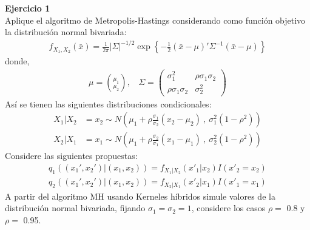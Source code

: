 \documentclass[a4paper, 11pt]{article}
\newenvironment{problem}[2][Ejercicio]
{ \begin{mdframed}[backgroundcolor= red!50] \textbf{#1 #2} \\}
	{  \end{mdframed}}
\begin{document}
	\setlength{\parskip}{\medskipamount}
	\setlength{\parindent}{0pt}

\begin{problem}{1} 
    Aplique el algoritmo de Metropolis-Hastings considerando como función objetivo la distribución normal bivariada:
    \begin{align*}
      f_{X_1,X_2}(\bar{x}) = \frac{1}{2\pi} |\Sigma|^{-1/2} \exp \left \{ -\frac{1}{2} (\bar{x} - \mu)' \Sigma^{-1}(\bar{x} - \mu) \right \}
    \end{align*}
    donde,
    \begin{align*}
      \mu = \binom{\mu_1}{\mu_2}, \:\:\:\: \Sigma = 
      \begin{pmatrix}
        \sigma_1^2 &  \rho \sigma_1 \sigma_2\\
        \rho \sigma_1 \sigma_2 & \sigma_2^2
      \end{pmatrix}
    \end{align*}
    Así se tienen las siguientes distribuciones condicionales: 
    \begin{align*}
      X_1|X_2 &= x_2 \sim N \left(\mu_1 + \rho \frac{\sigma_1 }{\sigma_2}(x_2 - \mu_2 )\:,\: \sigma_1^2 (1-\rho^2)\right)\\
      X_2|X_1 &= x_1 \sim N \left(\mu_1 + \rho \frac{\sigma_2 }{\sigma_1}(x_1 - \mu_1 )\:,\: \sigma_2^2 (1-\rho^2)\right)
    \end{align*}
    Considere las siguientes propuestas: 
    \begin{align*}
      q_1((x_1',x_2')|(x_1,x_2)) = f_{X_1|X_2}(x'_1|x_2)I(x'_2= x_2)\\
      q_2((x_1',x_2')|(x_1,x_2)) = f_{X_2|X_1}(x'_2|x_1)I(x'_1= x_1)
    \end{align*}
    A partir del algoritmo MH usando Kerneles híbridos simule valores de la distribución normal bivariada, fijando $\sigma_1 = \sigma_2=1$, considere los casos $\rho = $ 0.8 y $\rho = $ 0.95. 

\end{problem}
  
\end{document}
